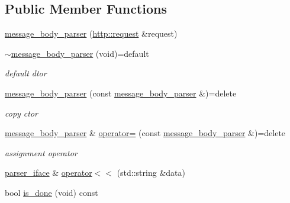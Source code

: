 \subsection*{Public Member Functions}
\begin{DoxyCompactItemize}
\item 
\hyperlink{classnetflex_1_1parsing_1_1message__body__parser_a04a55d3b4b1dcfac47fd21fe2606da5f}{message\+\_\+body\+\_\+parser} (\hyperlink{classnetflex_1_1http_1_1request}{http\+::request} \&request)
\item 
\mbox{\label{classnetflex_1_1parsing_1_1message__body__parser_a301f2b57282242ae37c0d094c5ad6951}} 
\hyperlink{classnetflex_1_1parsing_1_1message__body__parser_a301f2b57282242ae37c0d094c5ad6951}{$\sim$message\+\_\+body\+\_\+parser} (void)=default
\begin{DoxyCompactList}\small\item\em default dtor \end{DoxyCompactList}\item 
\mbox{\label{classnetflex_1_1parsing_1_1message__body__parser_a0ef5ba4567c214272bf7ff84a98b5447}} 
\hyperlink{classnetflex_1_1parsing_1_1message__body__parser_a0ef5ba4567c214272bf7ff84a98b5447}{message\+\_\+body\+\_\+parser} (const \hyperlink{classnetflex_1_1parsing_1_1message__body__parser}{message\+\_\+body\+\_\+parser} \&)=delete
\begin{DoxyCompactList}\small\item\em copy ctor \end{DoxyCompactList}\item 
\mbox{\label{classnetflex_1_1parsing_1_1message__body__parser_a0c5708195cecc7688ec3260ed38c5f88}} 
\hyperlink{classnetflex_1_1parsing_1_1message__body__parser}{message\+\_\+body\+\_\+parser} \& \hyperlink{classnetflex_1_1parsing_1_1message__body__parser_a0c5708195cecc7688ec3260ed38c5f88}{operator=} (const \hyperlink{classnetflex_1_1parsing_1_1message__body__parser}{message\+\_\+body\+\_\+parser} \&)=delete
\begin{DoxyCompactList}\small\item\em assignment operator \end{DoxyCompactList}\item 
\hyperlink{classnetflex_1_1parsing_1_1parser__iface}{parser\+\_\+iface} \& \hyperlink{classnetflex_1_1parsing_1_1message__body__parser_a891c157d04d1fc59c1524672c4574570}{operator$<$$<$} (std\+::string \&data)
\item 
bool \hyperlink{classnetflex_1_1parsing_1_1message__body__parser_a71557821eaea2a6b629f86165fbc2f52}{is\+\_\+done} (void) const
\end{DoxyCompactItemize}
